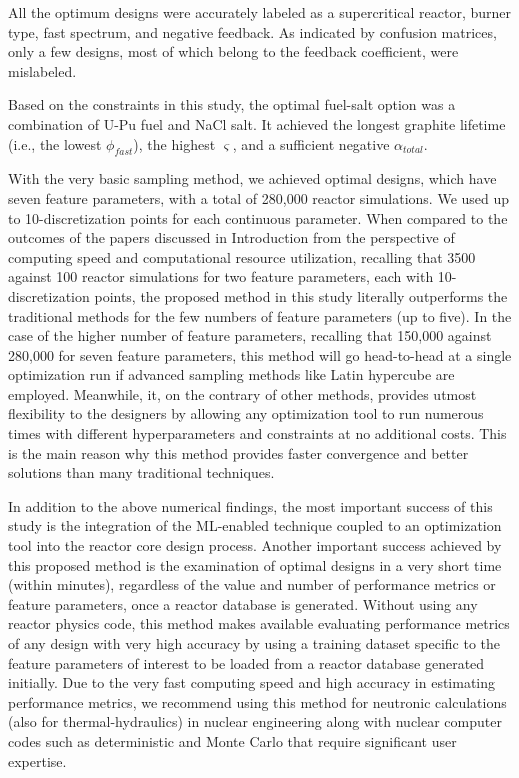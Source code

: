     All the optimum designs were accurately labeled as a supercritical reactor, burner type, fast spectrum, and negative feedback. As indicated by confusion matrices, only a few designs, most of which belong to the feedback coefficient, were mislabeled.

    Based on the constraints in this study, the optimal fuel-salt option was a combination of U-Pu fuel and NaCl salt. It achieved the longest graphite lifetime (i.e., the lowest $\phi_{fast}$), the highest $\varsigma$, and a sufficient negative ${\alpha_{total}}$.

    With the very basic sampling method, we achieved optimal designs, which have seven feature parameters, with a total of 280,000 reactor simulations. We used up to 10-discretization points for each continuous parameter. When compared to the outcomes of the papers discussed in Introduction \cite{pereira1999, pereira2003} from the perspective of computing speed and computational resource utilization, recalling that 3500 against 100 reactor simulations for two feature parameters, each with 10-discretization points, the proposed method in this study literally outperforms the traditional methods for the few numbers of feature parameters (up to five). In the case of the higher number of feature parameters, recalling that 150,000 against 280,000 for seven feature parameters, this method will go head-to-head at a single optimization run if advanced sampling methods like Latin hypercube are employed. Meanwhile, it, on the contrary of other methods, provides utmost flexibility to the designers by allowing any optimization tool to run numerous times with different hyperparameters and constraints at no additional costs. This is the main reason why this method provides faster convergence and better solutions than many traditional techniques.

    In addition to the above numerical findings, the most important success of this study is the integration of the \gls{ML}-enabled technique coupled to an optimization tool into the reactor core design process. Another important success achieved by this proposed method is the examination of optimal designs in a very short time (within minutes), regardless of the value and number of performance metrics or feature parameters, once a reactor database is generated. Without using any reactor physics code, this method makes available evaluating performance metrics of any design with very high accuracy by using a training dataset specific to the feature parameters of interest to be loaded from a reactor database generated initially. Due to the very fast computing speed and high accuracy in estimating performance metrics, we recommend using this method for neutronic calculations (also for thermal-hydraulics) in nuclear engineering along with nuclear computer codes such as deterministic and Monte Carlo that require significant user expertise.

